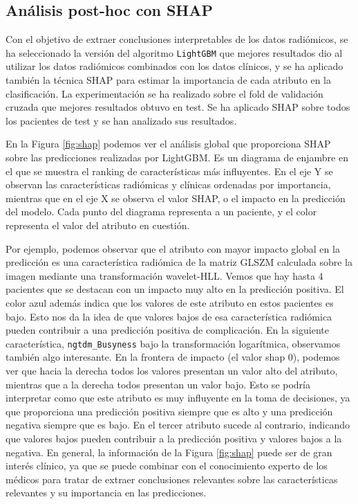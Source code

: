 \subsection{Análisis post-hoc con SHAP}

Con el objetivo de extraer conclusiones interpretables de los datos radiómicos, se ha seleccionado la versión del algoritmo \texttt{LightGBM} que mejores resultados dio al utilizar los datos radiómicos combinados con los datos clínicos, y se ha aplicado también la técnica SHAP para estimar la importancia de cada atributo en la clasificación. La experimentación se ha realizado sobre el fold de validación cruzada que mejores resultados obtuvo en test. Se ha aplicado SHAP sobre todos los pacientes de test y se han analizado sus resultados.

En la Figura \ref{fig:shap} podemos ver el análisis global que proporciona SHAP sobre las predicciones realizadas por LightGBM. Es un diagrama de enjambre en el que se muestra el ranking de características más influyentes. En el eje Y se observan las características radiómicas y clínicas ordenadas por importancia, mientras que en el eje X se observa el valor SHAP, o el impacto en la predicción del modelo. Cada punto del diagrama representa a un paciente, y el color representa el valor del atributo en cuestión.

Por ejemplo, podemos observar que el atributo con mayor impacto global en la predicción es una característica radiómica de la matriz GLSZM calculada sobre la imagen mediante una transformación wavelet-HLL. Vemos que hay hasta 4 pacientes que se destacan con un impacto muy alto en la predicción positiva. El color azul además indica que los valores de este atributo en estos pacientes es bajo. Esto nos da la idea de que valores bajos de esa característica radiómica pueden contribuir a una predicción positiva de complicación. En la siguiente característica, \texttt{ngtdm\_Busyness} bajo la transformación logarítmica, observamos también algo interesante. En la frontera de impacto (el valor shap 0), podemos ver que hacia la derecha todos los valores presentan un valor alto del atributo, mientras que a la derecha todos presentan un valor bajo. Esto se podría interpretar como que este atributo es muy influyente en la toma de decisiones, ya que proporciona una predicción positiva siempre que es alto y una predicción negativa siempre que es bajo. En el tercer atributo sucede al contrario, indicando que valores bajos pueden contribuir a la predicción positiva y valores bajos a la negativa. En general, la información de la Figura \ref{fig:shap} puede ser de gran interés clínico, ya que se puede combinar con el conocimiento experto de los médicos para tratar de extraer conclusiones relevantes sobre las características relevantes y su importancia en las predicciones.


